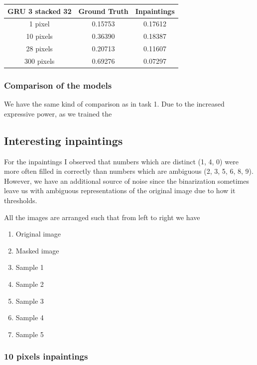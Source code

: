 \documentclass{article}
\begin{document}
\begin{center}
  \begin{tabular}{ |c|c|c| } 
    \hline
    GRU 3 stacked 32 & Ground Truth & Inpaintings \\
    \hline
    1 pixel & 0.15753 & 0.17612 \\
    10 pixels & 0.36390 & 0.18387 \\
    28 pixels & 0.20713 & 0.11607 \\
    300 pixels & 0.69276 & 0.07297 \\
    \hline
  \end{tabular}
\end{center}

\subsubsection{Comparison of the models}

We have the same kind of comparison as in task 1. Due to the increased
expressive power, as we trained the 

\subsection{Interesting inpaintings}

\newcommand\digitA{33}
\newcommand\digitB{65}
\newcommand\digitC{77}

For the inpaintings I observed that numbers which are distinct (1, 4, 0) were more often
filled in correctly than numbers which are ambiguous (2, 3, 5, 6, 8, 9).
However, we have an additional source of noise since the binarization sometimes
leave us with ambiguous representations of the original image due to how it
thresholds.

All the images are arranged such that from left to right we have

\begin{enumerate}[label=\arabic*.]
\item Original image
\item Masked image
\item Sample 1
\item Sample 2
\item Sample 3
\item Sample 4
\item Sample 5
\end{enumerate}

\subsubsection{10 pixels inpaintings}
\end{document}
